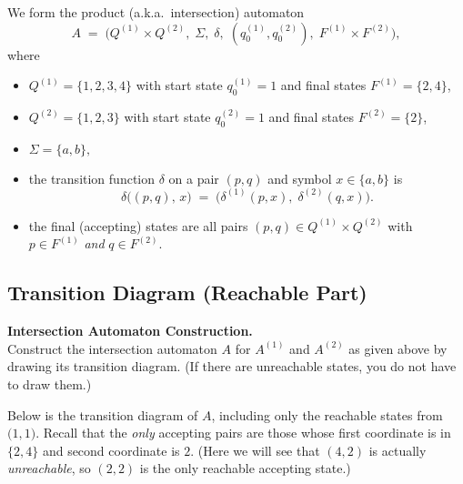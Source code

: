 \documentclass{article}
\theoremstyle{theorem}
\theoremstyle{definition}
\theoremstyle{remark}
\begin{document}
We form the product (a.k.a.\ intersection) automaton 
\[
  A \;=\; 
  \bigl( Q^{(1)} \times Q^{(2)}, \;\Sigma,\;\delta,\;(q_0^{(1)},q_0^{(2)}),\;F^{(1)} \times F^{(2)}\bigr),
\]
where
\begin{itemize}
\item 
  \(Q^{(1)} = \{1,2,3,4\}\) with start state \(q_0^{(1)} = 1\) and final states \(F^{(1)} = \{2,4\}\),
\item 
  \(Q^{(2)} = \{1,2,3\}\) with start state \(q_0^{(2)} = 1\) and final states \(F^{(2)} = \{2\}\),
\item 
  \(\Sigma = \{a,b\},\)
\item 
  the transition function \(\delta\) on a pair \((p,q)\) and symbol \(x\in\{a,b\}\) is
  \[
    \delta\bigl((p,q),\,x\bigr)
    \;=\;
    \bigl(\delta^{(1)}(p,x),\;\delta^{(2)}(q,x)\bigr).
  \]
\item 
  the final (accepting) states are all pairs 
  \((p,q)\in Q^{(1)}\times Q^{(2)}\) with \(p\in F^{(1)}\) \emph{and} \(q\in F^{(2)}\).
\end{itemize}

\subsection*{Transition Diagram (Reachable Part)}
\textbf{Intersection Automaton Construction.}\\
Construct the intersection automaton \(A\) for \(A^{(1)}\) and \(A^{(2)}\) as given above 
by drawing its transition diagram. 
(If there are unreachable states, you do not have to draw them.)

Below is the transition diagram of \(A\), including only the reachable states from \(\bigl(1,1\bigr)\).  
Recall that the \emph{only} accepting pairs are those whose first coordinate is in \(\{2,4\}\) and second coordinate is \(2\). 
(Here we will see that \((4,2)\) is actually \emph{unreachable}, so \((2,2)\) is the only reachable accepting state.)
\end{document}
